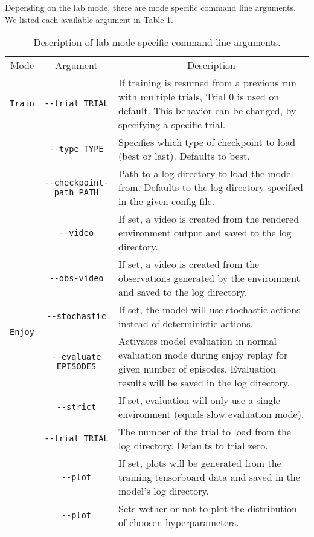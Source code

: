 Depending on the lab mode, there are mode specific command line arguments. We listed each available argument in Table \ref{tab:CommandLineArguments}.

\begin{table}[hp]
    \begin{center}
        \small
        \bgroup
        \def\arraystretch{1.25}%
        \begin{tabular}{|c|c|p{}|}
            \hline
            Mode & Argument & \multicolumn{1}{c|}{Description} \\
            \hhline{|=|=|=|}
            \texttt{Train} & \texttt{-{}-trial TRIAL} & If training is resumed from a previous run with multiple trials, Trial 0 is used on default. This behavior can be changed, by specifying a specific trial. \\
            \hline
            \multirow{15}{*}{\texttt{Enjoy}} & \texttt{-{}-type TYPE} & Specifies which type of checkpoint to load (best or last). Defaults to best. \\
            & \texttt{-{}-checkpoint-path PATH} & Path to a log directory to load the model from. Defaults to the log directory specified in the given config file. \\
            & \texttt{-{}-video} & If set, a video is created from the rendered environment output and saved to the log directory. \\
            & \texttt{-{}-obs-video} & If set, a video is created from the observations generated by the environment and saved to the log directory. \\
            & \texttt{-{}-stochastic} & If set, the model will use stochastic actions instead of deterministic actions. \\
            & \texttt{-{}-evaluate EPISODES} & Activates model evaluation in normal evaluation mode during enjoy replay for given number of episodes. Evaluation results will be saved in the log directory. \\
            & \texttt{-{}-strict} & If set, evaluation will only use a single environment (equals slow evaluation mode). \\
            & \texttt{-{}-trial TRIAL} & The number of the trial to load from the log directory. Defaults to trial zero. \\
            & \texttt{-{}-plot} & If set, plots will be generated from the training tensorboard data and saved in the model's log directory.\\
            \hline
            \texttt{Search} & \texttt{-{}-plot} & Sets wether or not to plot the distribution of choosen hyperparameters. \\
            \hline
        \end{tabular}
        \egroup
    \end{center}
    \vspace*{-1em}
    \caption[Mode Specific Command Line Arguments]{Description of lab mode specific command line arguments.} \label{tab:CommandLineArguments}
    \vspace*{-2em}
\end{table}

